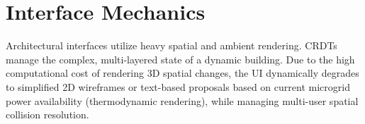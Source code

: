 \section{Interface Mechanics}
Architectural interfaces utilize heavy spatial and ambient rendering. CRDTs manage the complex, multi-layered state of a dynamic building. Due to the high computational cost of rendering 3D spatial changes, the UI dynamically degrades to simplified 2D wireframes or text-based proposals based on current microgrid power availability (thermodynamic rendering), while managing multi-user spatial collision resolution.
